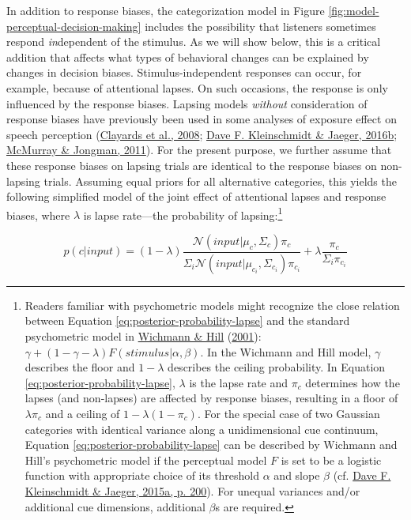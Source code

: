 \documentclass[
  11pt,
  english,
  man,floatsintext]{apa6}
\begin{document}
In addition to response biases, the categorization model in Figure \ref{fig:model-perceptual-decision-making} includes the possibility that listeners sometimes respond \emph{in}dependent of the stimulus. As we will show below, this is a critical addition that affects what types of behavioral changes can be explained by changes in decision biases. Stimulus-independent responses can occur, for example, because of attentional lapses. On such occasions, the response is only influenced by the response biases. Lapsing models \emph{without} consideration of response biases have previously been used in some analyses of exposure effect on speech perception (\protect\hyperlink{ref-clayards2008}{Clayards et al., 2008}; \protect\hyperlink{ref-kleinschmidt-jaeger2016cogsci}{Dave F. Kleinschmidt \& Jaeger, 2016b}; \protect\hyperlink{ref-mcmurray-jongman2011}{McMurray \& Jongman, 2011}). For the present purpose, we further assume that these response biases on lapsing trials are identical to the response biases on non-lapsing trials. Assuming equal priors for all alternative categories, this yields the following simplified model of the joint effect of attentional lapses and response biases, where \(\lambda\) is lapse rate---the probability of lapsing:\footnote{Readers familiar with psychometric models might recognize the close relation between Equation \eqref{eq:posterior-probability-lapse} and the standard psychometric model in \protect\hyperlink{ref-wichmann-hill2001}{Wichmann \& Hill} (\protect\hyperlink{ref-wichmann-hill2001}{2001}): \(\gamma + (1-\gamma-\lambda) F(stimulus | \alpha, \beta)\). In the Wichmann and Hill model, \(\gamma\) describes the floor and \(1-\lambda\) describes the ceiling probability. In Equation \eqref{eq:posterior-probability-lapse}, \(\lambda\) is the lapse rate and \(\pi_c\) determines how the lapses (and non-lapses) are affected by response biases, resulting in a floor of \(\lambda \pi_c\) and a ceiling of \(1 - \lambda(1 - \pi_c)\). For the special case of two Gaussian categories with identical variance along a unidimensional cue continuum, Equation \eqref{eq:posterior-probability-lapse} can be described by Wichmann and Hill's psychometric model if the perceptual model \(F\) is set to be a logistic function with appropriate choice of its threshold \(\alpha\) and slope \(\beta\) (cf. \protect\hyperlink{ref-kleinschmidt-jaeger2015}{Dave F. Kleinschmidt \& Jaeger, 2015a, p. 200}). For unequal variances and/or additional cue dimensions, additional \(\beta\)s are required.}

\begin{equation}\label{eq:posterior-probability-lapse}
p(c | input) = (1 - \lambda) \frac{\mathcal{N}\!\left( input | \mu_c, \Sigma_c \right) \pi_c}{\Sigma_i \mathcal{N}\!\left( input | \mu_{c_i}, \Sigma_{c_i} \right) \pi_{c_i}} + \lambda \frac{\pi_c}{\Sigma_i \pi_{c_i}}
\end{equation}
\end{document}
